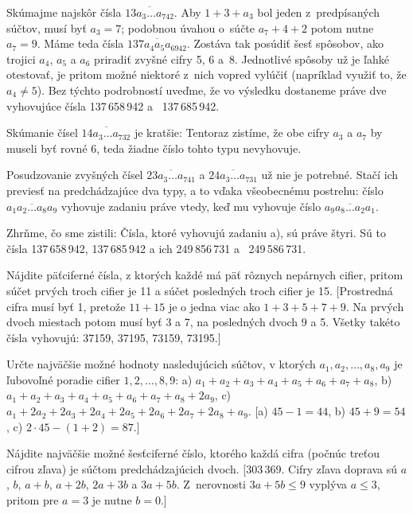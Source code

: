 {Skúmajme najskôr čísla $\overline{13a_3\ldots a_742}$. Aby
$1+3+a_3$ bol jeden z~predpísaných súčtov, musí byť $a_3=7$;
podobnou úvahou o~súčte $a_7+4+2$ potom nutne $a_7=9$.
Máme teda čísla $\overline{137a_4a_5a_6942}$. Zostáva tak
posúdiť šesť spôsobov, ako trojici $a_4$, $a_5$ a $a_6$
priradiť zvyšné cifry 5, 6 a~8. Jednotlivé spôsoby už je ľahké
otestovať, je pritom možné niektoré z~nich vopred
vylúčiť (napríklad využiť to, že $a_4\ne5$). Bez týchto
podrobností uveďme, že vo výsledku dostaneme práve dve
vyhovujúce čísla 137\,658\,942 a ~137\,685\,942.

\smallskip
Skúmanie čísel $\overline{14a_3\ldots a_732}$ je kratšie:
Tentoraz zistíme, že obe cifry $a_3$ a $a_7$ by museli
byť rovné 6, teda žiadne číslo tohto typu nevyhovuje.

\smallskip
Posudzovanie zvyšných čísel $\overline{23a_3\ldots a_741}$ a
$\overline{24a_3\ldots a_731}$ už nie je potrebné. Stačí ich previesť na
predchádzajúce dva typy, a to vďaka všeobecnému postrehu:
číslo $\overline{a_1a_2\ldots a_8a_9}$ vyhovuje zadaniu
práve vtedy, keď mu vyhovuje  číslo
$\overline{a_9a_8\ldots a_2a_1}$.

\smallskip
Zhrňme, čo sme zistili: Čísla, ktoré vyhovujú zadaniu a),
sú práve štyri. Sú to čísla
137\,658\,942, 137\,685\,942 a ich 
249\,856\,731 a ~249\,586\,731.


Nájdite päťciferné čísla, z ktorých každé má päť rôznych
nepárnych cifier, pritom súčet prvých troch cifier je 11 a súčet
posledných troch cifier je 15.
[Prostredná cifra musí byť 1, pretože $11+15$ je o jedna viac
ako $1+3+5+7+9$. Na prvých dvoch miestach potom musí byť 3 a 7,
na posledných dvoch 9 a 5. Všetky takéto čísla vyhovujú:
37159, 37195, 73159, 73195.]

Určte najväčšie možné hodnoty nasledujúcich súčtov, v ktorých
$a_1,a_2,\dots,a_8,a_9$ je ľubovoľné poradie
cifier $1,2,\dots,8,9$:\hfil\break
a) $a_1+a_2+a_3+a_4+a_5+a_6+a_7+a_8$,\hfil\break
b) $a_1+a_2+a_3+a_4+a_5+a_6+a_7+a_8+2a_9$,\hfil\break
c) $a_1+2a_2+2a_3+2a_4+2a_5+2a_6+2a_7+2a_8+a_9$.\hfil{}
[a) $45-1=44$, b) $45+9=54$, c) $2\cdot45-(1+2)=87$.]

\D
Nájdite najväčšie možné šesťciferné číslo, ktorého každá cifra
(počnúc treťou cifrou zľava) je súčtom predchádzajúcich
dvoch.
[303\,369. Cifry zľava doprava sú $a$, $b$, $a+b$,
$a+2b$, $2a+3b$ a $3a+5b$. Z~nerovnosti $3a+5b\leq9$ vyplýva
$a\leq3$, pritom pre $a=3$ je nutne $b=0$.]

}
